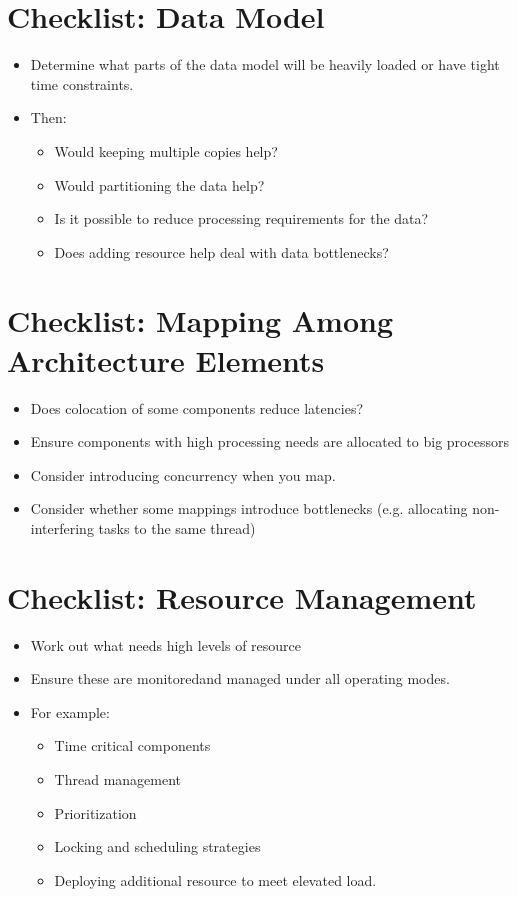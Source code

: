 \documentclass[a4paper]{report}
\begin{document}
\section{Checklist: Data Model}
\begin{itemize}
\item{Determine what parts of the data model will be heavily loaded or have tight time constraints.}
\item{Then:
\begin{itemize}
\item{Would keeping multiple copies help?}
\item{Would partitioning the data help?}
\item{Is it possible to reduce processing requirements for the data?}
\item{Does adding resource help deal with data bottlenecks?}
\end{itemize}}
\end{itemize}

\section{Checklist: Mapping Among Architecture Elements }
\begin{itemize}
\item{Does colocation of some components reduce latencies?}
\item{Ensure components with high processing needs are allocated to big processors}
\item{Consider introducing concurrency when you map.}
\item{Consider whether some mappings introduce bottlenecks (e.g. allocating non-interfering tasks to the same thread)}
\end{itemize}

\section{Checklist: Resource Management}
\begin{itemize}
\item{Work out what needs high levels of resource}
\item{Ensure these are monitoredand managed under all operating modes.}
\item{For example:
\begin{itemize}
\item{Time critical components}
\item{Thread management}
\item{Prioritization}
\item{Locking and scheduling strategies}
\item{Deploying additional resource to meet elevated load.}
\end{itemize}
}
\end{itemize}
\end{document}
